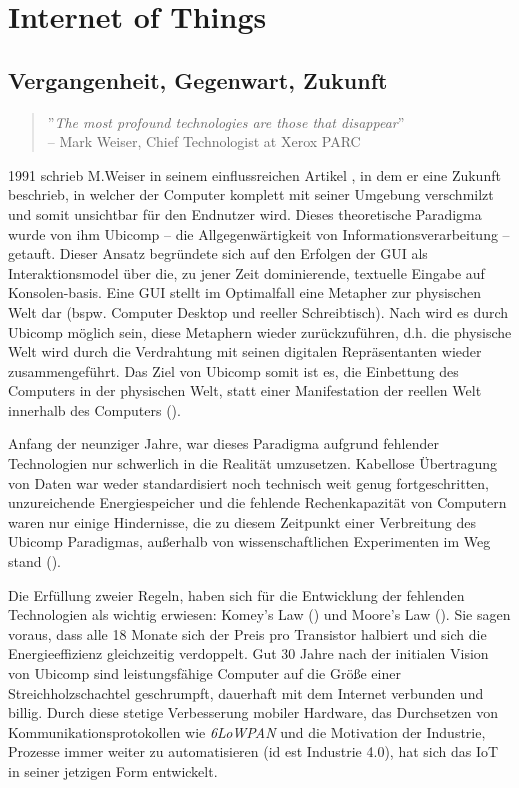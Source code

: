 \section{Internet of Things}
\subsection{Vergangenheit, Gegenwart, Zukunft}
\begin{quote}
''\textit{The most profound technologies are those that disappear}'' \\-- Mark Weiser, Chief Technologist at Xerox PARC
\end{quote}

1991 schrieb M.Weiser in seinem einflussreichen Artikel \cite{weiser1991computer}, in dem er eine Zukunft beschrieb, in welcher der Computer komplett mit seiner Umgebung verschmilzt und somit unsichtbar für den Endnutzer wird. Dieses theoretische Paradigma wurde von ihm \ac{Ubicomp} -- die Allgegenwärtigkeit von Informationsverarbeitung -- getauft. Dieser Ansatz begründete sich auf den Erfolgen der \ac{GUI} als Interaktionsmodel über die, zu jener Zeit dominierende, textuelle Eingabe auf Konsolen-basis. Eine \ac{GUI} stellt im Optimalfall eine Metapher zur physischen Welt dar (bspw. Computer Desktop und reeller Schreibtisch). Nach \cite{weiser1991computer} wird es durch \ac{Ubicomp} möglich sein, diese Metaphern wieder zurückzuführen, d.h. die physische Welt wird durch die Verdrahtung mit seinen digitalen Repräsentanten wieder zusammengeführt. Das Ziel von \ac{Ubicomp} somit ist es, die Einbettung des Computers in der physischen Welt, statt einer Manifestation der reellen Welt innerhalb des Computers (\cite{lyytinen2002ubiquitous}). 

Anfang der neunziger Jahre, war dieses Paradigma aufgrund fehlender Technologien nur schwerlich in die Realität umzusetzen. Kabellose Übertragung von Daten war weder standardisiert noch technisch weit genug fortgeschritten, unzureichende Energiespeicher und die fehlende Rechenkapazität von Computern waren nur einige Hindernisse, die zu diesem Zeitpunkt einer Verbreitung des \ac{Ubicomp} Paradigmas, außerhalb von wissenschaftlichen Experimenten im Weg stand (\cite{lyytinen2002ubiquitous}).

Die Erfüllung zweier Regeln, haben sich für die Entwicklung der fehlenden Technologien als wichtig erwiesen: Komey's Law (\cite{koomey2010law}) und Moore's Law (\cite{schaller1997moore}). Sie sagen voraus, dass alle 18 Monate sich der Preis pro Transistor halbiert und sich die Energieeffizienz gleichzeitig verdoppelt. Gut 30 Jahre nach der initialen Vision von \ac{Ubicomp} sind leistungsfähige Computer auf die Größe einer Streichholzschachtel geschrumpft, dauerhaft mit dem Internet verbunden und billig. Durch diese stetige Verbesserung mobiler Hardware, das Durchsetzen von Kommunikationsprotokollen wie \textit{6LoWPAN} und die Motivation der Industrie, Prozesse immer weiter zu automatisieren (id est Industrie 4.0), hat sich das \acf{IoT} in seiner jetzigen Form entwickelt.

